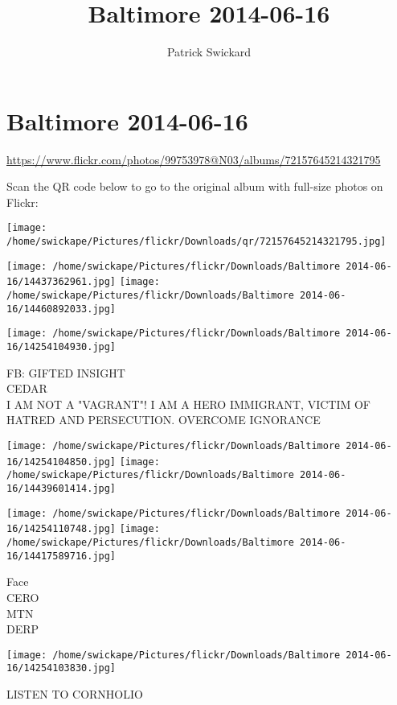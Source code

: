 \documentclass[10pt,letterpaper]{article}
\title{Baltimore 2014-06-16}
\author{Patrick Swickard}
\date{}
\begin{document}
\section*{Baltimore 2014-06-16}

\url{https://www.flickr.com/photos/99753978@N03/albums/72157645214321795}

Scan the QR code below to go to the original album with full-size photos on Flickr:

\texttt{[image: /home/swickape/Pictures/flickr/Downloads/qr/72157645214321795.jpg]}
\pagebreak

\texttt{[image: /home/swickape/Pictures/flickr/Downloads/Baltimore 2014-06-16/14437362961.jpg]}
\texttt{[image: /home/swickape/Pictures/flickr/Downloads/Baltimore 2014-06-16/14460892033.jpg]}

\vspace{0.25in}
\texttt{[image: /home/swickape/Pictures/flickr/Downloads/Baltimore 2014-06-16/14254104930.jpg]}

FB: GIFTED INSIGHT\\
CEDAR\\
I AM NOT A "VAGRANT"!  I AM A HERO IMMIGRANT, VICTIM OF HATRED AND PERSECUTION.  OVERCOME IGNORANCE
\pagebreak

\texttt{[image: /home/swickape/Pictures/flickr/Downloads/Baltimore 2014-06-16/14254104850.jpg]}
\texttt{[image: /home/swickape/Pictures/flickr/Downloads/Baltimore 2014-06-16/14439601414.jpg]}

\texttt{[image: /home/swickape/Pictures/flickr/Downloads/Baltimore 2014-06-16/14254110748.jpg]}
\texttt{[image: /home/swickape/Pictures/flickr/Downloads/Baltimore 2014-06-16/14417589716.jpg]}

Face\\
CERO\\
MTN\\
DERP
\pagebreak

\texttt{[image: /home/swickape/Pictures/flickr/Downloads/Baltimore 2014-06-16/14254103830.jpg]}

LISTEN TO CORNHOLIO
\pagebreak
\end{document}
